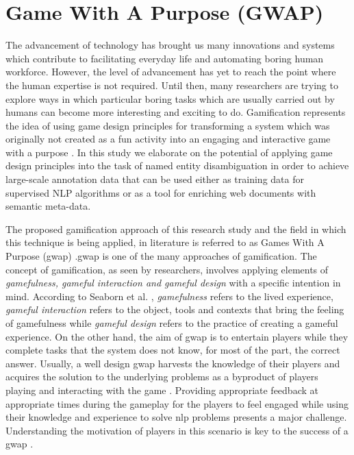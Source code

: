 \section{Game With A Purpose (GWAP)}
\label{thb:gamedesign}
\if The advancement of technology has brought us many innovations and systems which contribute to facilitating everyday life and automating boring human workforce. However, the level of advancement has yet to reach the point where the human expertise is not required. Until then, many researchers are trying to explore ways in which particular boring tasks which are usually carried out by humans can become more interesting and exciting to do. \fi Gamification represents the idea of using game design principles for transforming a system which was originally not created as a fun activity into an engaging and interactive game with a purpose \cite{vonahn, 47}. In this study we elaborate on the potential of applying game design principles into the task of named entity disambiguation in order to achieve large-scale annotation data that can be used either as training data for supervised NLP algorithms or as a tool for enriching web documents with semantic meta-data.

The proposed gamification approach of this research study and the field in which this technique is being applied, in literature is referred to as Games With A Purpose (\ac{gwap}) \cite{vonahn}.\ac{gwap} is one of the many approaches of gamification. The concept of gamification, as seen by researchers, involves applying elements of \textit{gamefulness, gameful interaction and gameful design} with a specific intention in mind. According to Seaborn et al. \cite{47}, \textit{gamefulness} refers to the lived experience, \textit{gameful interaction} refers to the object, tools and contexts that bring the feeling of gamefulness while \textit{gameful design} refers to the practice of creating a gameful experience. On the other hand, the aim of \ac{gwap} is to entertain players while they complete tasks that the system does not know, for most of the part, the correct answer. Usually, a well design \ac{gwap} harvests the knowledge of their players and acquires the solution to the underlying problems as a byproduct of players playing and interacting with the game \cite{vonahn}. Providing appropriate feedback at appropriate times during the gameplay for the players to feel engaged while using their knowledge and experience to solve \ac{nlp} problems presents a major challenge. Understanding the motivation of players in this scenario is key to the success of a \ac{gwap} \cite{43}.

